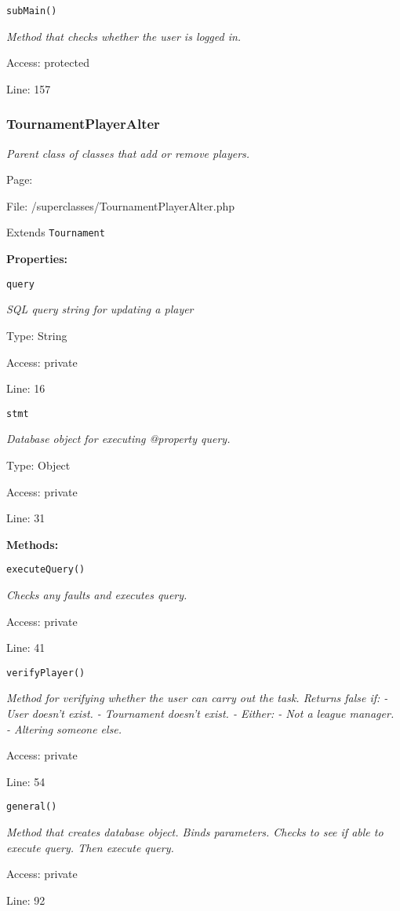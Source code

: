 \texttt{subMain()}

{\scriptsize
\textit{Method that checks whether the user is logged in.}

Access: protected

Line: 157

}

\subsubsection{TournamentPlayerAlter}\label{TournamentPlayerAlter.php.doc}
\textit{Parent class of classes that add or remove players.}

Page: \pageref{TournamentPlayerAlter.php}

File: /superclasses/TournamentPlayerAlter.php

Extends \texttt{Tournament}

\textbf{Properties:}

\texttt{query}

{\scriptsize
\textit{SQL query string for updating a player}

Type: String

Access: private

Line: 16

}
\texttt{stmt}

{\scriptsize
\textit{Database object for executing @property query.}

Type: Object

Access: private

Line: 31

}
\textbf{Methods:}

\texttt{executeQuery()}

{\scriptsize
\textit{Checks any faults and executes query.}

Access: private

Line: 41

}

\texttt{verifyPlayer()}

{\scriptsize
\textit{Method for verifying whether the user can carry out the task.
Returns false if:
- User doesn't exist.
- Tournament doesn't exist.
- Either:
  - Not a league manager.
  - Altering someone else.}

Access: private

Line: 54

}

\texttt{general()}

{\scriptsize
\textit{Method that creates database object.
Binds parameters.
Checks to see if able to execute query.
Then execute query.}

Access: private

Line: 92

}

